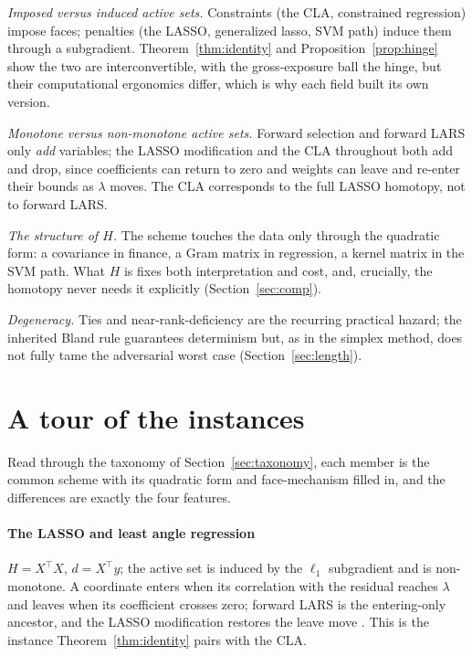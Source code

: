 \documentclass[sts]{imsart}
\newcommand{\trans}{^{\top}}
\theoremstyle{plain}
\theoremstyle{definition}
\begin{document}
\emph{Imposed versus induced active sets.} Constraints (the CLA, constrained
regression) impose faces; penalties (the LASSO, generalized lasso, SVM path) induce
them through a subgradient. Theorem~\ref{thm:identity} and
Proposition~\ref{prop:hinge} show the two are interconvertible, with the
gross-exposure ball the hinge, but their computational ergonomics differ, which is
why each field built its own version.

\emph{Monotone versus non-monotone active sets.} Forward selection and forward LARS
only \emph{add} variables; the LASSO modification and the CLA throughout both add and
drop, since coefficients can return to zero and weights can leave and re-enter their
bounds as $\lambda$ moves. The CLA corresponds to the full LASSO homotopy, not to
forward LARS.

\emph{The structure of $H$.} The scheme touches the data only through the quadratic
form: a covariance in finance, a Gram matrix in regression, a kernel matrix in the SVM
path. What $H$ is fixes both interpretation and cost, and, crucially, the homotopy
never needs it explicitly (Section~\ref{sec:comp}).

\emph{Degeneracy.} Ties and near-rank-deficiency are the recurring practical hazard;
the inherited Bland rule guarantees determinism but, as in the simplex method, does not
fully tame the adversarial worst case (Section~\ref{sec:length}).

\section{A tour of the instances}
\label{sec:tour}

Read through the taxonomy of Section~\ref{sec:taxonomy}, each member is the common
scheme with its quadratic form and face-mechanism filled in, and the differences are
exactly the four features.

\paragraph{The LASSO and least angle regression} $H=X\trans X$, $d=X\trans y$; the
active set is induced by the $\ell_1$ subgradient and is non-monotone. A coordinate
enters when its correlation with the residual reaches $\lambda$ and leaves when its
coefficient crosses zero; forward LARS is the entering-only ancestor, and the LASSO
modification restores the leave move \citep{efron2004}. This is the instance
Theorem~\ref{thm:identity} pairs with the CLA.
\end{document}
